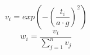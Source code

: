 \documentclass{article}
\begin{document}
$$ v_i=exp \left(-\left(\frac{ t_i }{a \cdot g }\right)^2 \right) $$
$$ w_i=\frac{v_i}{\sum_{j=1}^{n} v_j} $$
\end{document}
